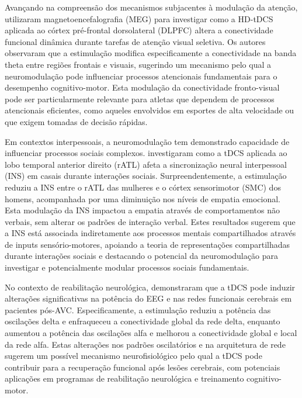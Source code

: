 Avançando na compreensão dos mecanismos subjacentes à modulação da atenção,  utilizaram magnetoencefalografia (MEG) para investigar como a HD-tDCS aplicada ao córtex pré-frontal dorsolateral (DLPFC) altera a conectividade funcional dinâmica durante tarefas de atenção visual seletiva. Os autores observaram que a estimulação modifica especificamente a conectividade na banda theta entre regiões frontais e visuais, sugerindo um mecanismo pelo qual a neuromodulação pode influenciar processos atencionais fundamentais para o desempenho cognitivo-motor. Esta modulação da conectividade fronto-visual pode ser particularmente relevante para atletas que dependem de processos atencionais eficientes, como aqueles envolvidos em esportes de alta velocidade ou que exigem tomadas de decisão rápidas.

Em contextos interpessoais, a neuromodulação tem demonstrado capacidade de influenciar processos sociais complexos.  investigaram como a tDCS aplicada ao lobo temporal anterior direito (rATL) afeta a sincronização neural interpessoal (INS) em casais durante interações sociais. Surpreendentemente, a estimulação reduziu a INS entre o rATL das mulheres e o córtex sensorimotor (SMC) dos homens, acompanhada por uma diminuição nos níveis de empatia emocional. Esta modulação da INS impactou a empatia através de comportamentos não verbais, sem alterar os padrões de interação verbal. Estes resultados sugerem que a INS está associada indiretamente aos processos mentais compartilhados através de inputs sensório-motores, apoiando a teoria de representações compartilhadas durante interações sociais e destacando o potencial da neuromodulação para investigar e potencialmente modular processos sociais fundamentais.

No contexto de reabilitação neurológica,  demonstraram que a tDCS pode induzir alterações significativas na potência do EEG e nas redes funcionais cerebrais em pacientes pós-AVC. Especificamente, a estimulação reduziu a potência das oscilações delta e enfraqueceu a conectividade global da rede delta, enquanto aumentou a potência das oscilações alfa e melhorou a conectividade global e local da rede alfa. Estas alterações nos padrões oscilatórios e na arquitetura de rede sugerem um possível mecanismo neurofisiológico pelo qual a tDCS pode contribuir para a recuperação funcional após lesões cerebrais, com potenciais aplicações em programas de reabilitação neurológica e treinamento cognitivo-motor.

